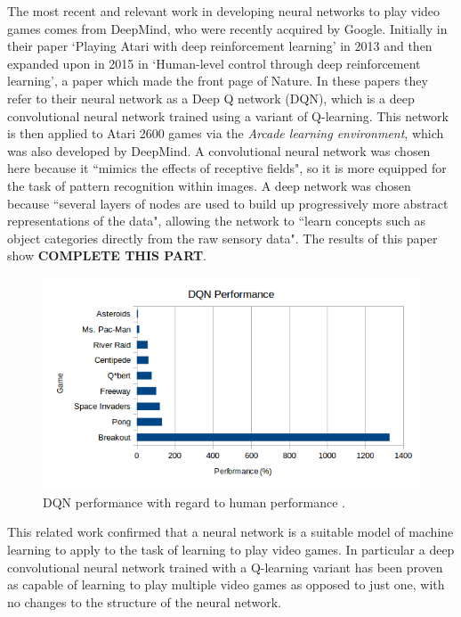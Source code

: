 \documentclass[10pt]{article}
\begin{document}
		The most recent and relevant work in developing neural networks to play video games comes from DeepMind, who were recently acquired by Google. Initially in their paper `Playing Atari with deep reinforcement learning' in 2013 and then expanded upon in 2015 in `Human-level control through deep reinforcement learning', a paper which made the front page of Nature. In these papers they refer to their neural network as a Deep Q network (DQN), which is a deep convolutional neural network trained using a variant of Q-learning. This network is then applied to Atari 2600 games via the \textit{Arcade learning environment}, which was also developed by DeepMind. A convolutional neural network was chosen here because it ``mimics the effects of receptive fields"\cite{humanlevel}, so it is more equipped for the task of pattern recognition within images. A deep network was chosen because ``several layers of nodes are used to build up progressively more abstract representations of the data"\cite{humanlevel}, allowing the network to ``learn concepts such as object categories directly from the raw sensory data"\cite{humanlevel}. The results of this paper show \textbf{COMPLETE THIS PART}.\\
		
		\begin{figure}[h]				
			\includegraphics[scale=0.7]{img/deepMindPerformance}
			\centering
			\caption{DQN performance with regard to human performance \cite{humanlevel}.}
			\label{fig:performance}
		\end{figure}
		
		This related work confirmed that a neural network is a suitable model of machine learning to apply to the task of learning to play video games. In particular a deep convolutional neural network trained with a Q-learning variant has been proven as capable of learning to play multiple video games as opposed to just one, with no changes to the structure of the neural network.\\
		
\end{document}
